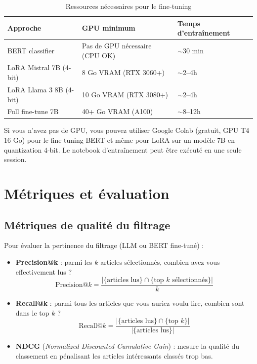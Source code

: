 \documentclass[11pt, a4paper]{article}
\begin{document}
\begin{table}[h]
\centering
\begin{tabular}{lll}
\toprule
\textbf{Approche} & \textbf{GPU minimum} & \textbf{Temps d'entraînement} \\
\midrule
BERT classifier & Pas de GPU nécessaire (CPU OK) & $\sim$30 min \\
LoRA Mistral 7B (4-bit) & 8 Go VRAM (RTX 3060+) & $\sim$2--4h \\
LoRA Llama 3 8B (4-bit) & 10 Go VRAM (RTX 3080+) & $\sim$2--4h \\
Full fine-tune 7B & 40+ Go VRAM (A100) & $\sim$8--12h \\
\bottomrule
\end{tabular}
\caption{Ressources nécessaires pour le fine-tuning}
\end{table}

\begin{warnbox}
Si vous n'avez pas de GPU, vous pouvez utiliser Google Colab (gratuit, GPU T4 16 Go) pour le fine-tuning BERT et même pour LoRA sur un modèle 7B en quantization 4-bit. Le notebook d'entraînement peut être exécuté en une seule session.
\end{warnbox}

\section{Métriques et évaluation}

\subsection{Métriques de qualité du filtrage}

Pour évaluer la pertinence du filtrage (LLM ou BERT fine-tuné) :

\begin{itemize}
    \item \textbf{Precision@k} : parmi les $k$ articles sélectionnés, combien avez-vous effectivement lus ?
    \begin{equation}
        \text{Precision@}k = \frac{|\{\text{articles lus}\} \cap \{\text{top } k \text{ sélectionnés}\}|}{k}
    \end{equation}

    \item \textbf{Recall@k} : parmi tous les articles que vous auriez voulu lire, combien sont dans le top $k$ ?
    \begin{equation}
        \text{Recall@}k = \frac{|\{\text{articles lus}\} \cap \{\text{top } k\}|}{|\{\text{articles lus}\}|}
    \end{equation}

    \item \textbf{NDCG} (\textit{Normalized Discounted Cumulative Gain}) : mesure la qualité du classement en pénalisant les articles intéressants classés trop bas.
\end{itemize}
\end{document}
